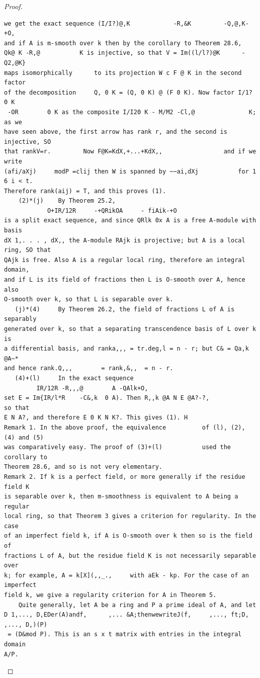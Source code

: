 \begin{proof}
\begin{verbatim}
we get the exact sequence (I/I?)@,K            -R,&K         -Q,@,K-+O,
and if A is m-smooth over k then by the corollary to Theorem 28.6,
Qk@ K -R,@           K is injective, so that V = Im((l/l?)@K      -Q2,@K}
maps isomorphically      to its projection W c F @ K in the second factor
of the decomposition     Q, 0 K = (Q, 0 K) @ (F 0 K). Now factor I/1? 0 K
 -OR        0 K as the composite I/I20 K - M/M2 -Cl,@               K; as we
have seen above, the first arrow has rank r, and the second is injective, SO
that rankV=r.         Now F@K=KdX,+...+KdX,,                 and if we write
(afi/aXj)     modP =clij then W is spanned by ~~ai,dXj           for 1 6 i < t.
Therefore rank(aij) = T, and this proves (1).
    (2)*(j)    By Theorem 25.2,
            O+IR/12R     -+QRikOA     - fiAik-+O
is a split exact sequence, and since QRlk 0x A is a free A-module with basis
dX 1,. . . , dX,, the A-module RAjk is projective; but A is a local ring, SO that
QAjk is free. Also A is a regular local ring, therefore an integral domain,
and if L is its field of fractions then L is O-smooth over A, hence also
O-smooth over k, so that L is separable over k.
   (j)*(4)     By Theorem 26.2, the field of fractions L of A is separably
generated over k, so that a separating transcendence basis of L over k is
a differential basis, and ranka,,, = tr.deg,l = n - r; but C& = Qa,k @A~*
and hence rank.Q,,,        = rank,&,,  = n - r.
   (4)+(l)     In the exact sequence
         IR/12R -R,,,@        A -QAlk+O,
set E = Im{IR/l*R    -C&,k  0 A). Then R,,k @A N E @A?-?,               so that
E N A?, and therefore E 0 K N K?. This gives (1). H
Remark 1. In the above proof, the equivalence          of (l), (2), (4) and (5)
was comparatively easy. The proof of (3)+(l)           used the corollary to
Theorem 28.6, and so is not very elementary.
Remark 2. If k is a perfect field, or more generally if the residue field K
is separable over k, then m-smoothness is equivalent to A being a regular
local ring, so that Theorem 3 gives a criterion for regularity. In the case
of an imperfect field k, if A is O-smooth over k then so is the field of
fractions L of A, but the residue field K is not necessarily separable over
k; for example, A = k[X](,,_.,     with aEk - kp. For the case of an imperfect
field k, we give a regularity criterion for A in Theorem 5.
    Quite generally, let A be a ring and P a prime ideal of A, and let
D 1,..., D,EDer(A)andf,      ,... &A;thenwewriteJ(f,     ,..., ft;D, ,..., D,)(P)
 = (D&mod P). This is an s x t matrix with entries in the integral domain
A/P.
\end{verbatim}
\end{proof}


